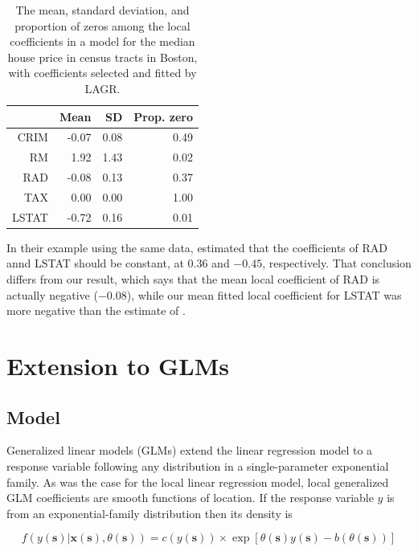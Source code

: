 \documentclass[authoryear,review, 12pt]{elsarticle}
\begin{document}
\begin{table}
\centering
\begin{tabular}{rrrr}
  & Mean & SD & Prop. zero \\ 
  \hline
CRIM & -0.07 & 0.08 & 0.49 \\ 
  RM & 1.92 & 1.43 & 0.02 \\ 
  RAD & -0.08 & 0.13 & 0.37 \\ 
  TAX & 0.00 & 0.00 & 1.00 \\ 
  LSTAT & -0.72 & 0.16 & 0.01 \\ 
  \end{tabular}
\caption{The mean, standard deviation, and proportion of zeros among the local coefficients in a model for the median house price in census tracts in Boston, with coefficients selected and fitted by LAGR.} 
\label{tab:boston-coefs-lagr}
\end{table}


In their example using the same data, \citet{Sun-Yan-Zhang-Lu-2014}
estimated that the coefficients of RAD annd LSTAT should be constant,
at $0.36$ and $-0.45$, respectively. That conclusion differs from
our result, which says that the mean local coefficient of RAD is actually
negative (\ensuremath{-0.08}), while
our mean fitted local coefficient for LSTAT was more negative than
the estimate of \citet{Sun-Yan-Zhang-Lu-2014}.


\section{Extension to GLMs\label{sec:lagr-gllm}}


\subsection{Model}

Generalized linear models (GLMs) extend the linear regression model
to a response variable following any distribution in a single-parameter
exponential family. As was the case for the local linear regression
model, local generalized GLM coefficients are smooth functions of
location. If the response variable $y$ is from an exponential-family
distribution then its density is 

\[
f\left(y\left(\bm{s}\right)|\bm{x}\left(\bm{s}\right),\theta\left(\bm{s}\right)\right)=c\left(y\left(\bm{s}\right)\right)\times\exp\left[\theta\left(\bm{s}\right)y\left(\bm{s}\right)-b\left(\theta\left(\bm{s}\right)\right)\right]
\]
\end{document}
